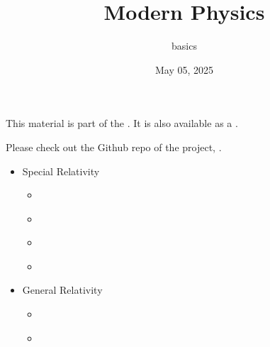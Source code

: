 \documentclass[letterpaper,10pt,english]{jupyterBook}
\title{Modern Physics}
\date{May 05, 2025}
\author{basics}
\begin{document}
\pagestyle{empty}
\sphinxmaketitle
\pagestyle{plain}
\sphinxtableofcontents
\pagestyle{normal}
\label{\detokenize{intro::doc}}


\sphinxAtStartPar
This material is part of the . It is also available as a .

\sphinxAtStartPar
Please check out the Github repo of the project, .
\begin{itemize}
\item {} 
\sphinxAtStartPar
Special Relativity

\begin{itemize}
\item {} 
\sphinxAtStartPar
{\hyperref[\detokenize{ch/relativity-special/intro::doc}]{}}

\item {} 
\sphinxAtStartPar
{\hyperref[\detokenize{ch/relativity-special/notes::doc}]{}}

\item {} 
\sphinxAtStartPar
{\hyperref[\detokenize{ch/relativity-special/lorentz::doc}]{}}

\item {} 
\sphinxAtStartPar
{\hyperref[\detokenize{ch/relativity-special/em::doc}]{}}

\end{itemize}
\end{itemize}
\begin{itemize}
\item {} 
\sphinxAtStartPar
General Relativity

\begin{itemize}
\item {} 
\sphinxAtStartPar
{\hyperref[\detokenize{ch/relativity-general/intro::doc}]{}}

\item {} 
\sphinxAtStartPar
{\hyperref[\detokenize{ch/relativity-general/notes::doc}]{}}

\end{itemize}
\end{itemize}
\end{document}
